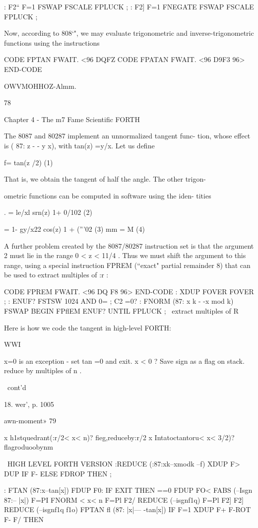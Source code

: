 {{: F2“ F=1 FSWAP FSCALE FPLUCK ;
: F2] F=1 FNEGATE FSWAP FSCALE FPLUCK ;

Now, according to 808‘", we may evaluate trigonometric and
inverse-trigonometric functions using the instructions

CODE FPTAN FWAIT. <96 DQFZ %
CODE FPATAN FWAIT. <96 D9F3 96> END-CODE

OWVMOHHOZ-Almm.

78

Chapter 4 - The m7 Fame Scientific FORTH

The 8087 and 80287 implement an unnormalized tangent func-
tion, whose effect is ( 87: z - - y x), with tan(z) =y/x. Let us define

f= tan(z /2) (1)

That is, we obtain the tangent of half the angle. The other trigon-

ometric functions can be computed in software using the iden-
tities

. = le/xl
srn(z) 1+ 0/102 (2)

= 1- gy/x22
cos(z) 1 + (”’02 (3)
mm = M (4)

A further problem created by the 8087/80287 instruction set is
that the argument 2 must lie in the range 0 < z < 11/4 . Thus we
must shift the argument to this range, using a special instruction
FPREM (“exact" partial remainder 8) that can be used to extract
multiples of :r :

CODE FPREM FWAIT. <96 DQ F8 96> END-CODE
: XDUP FOVER FOVER ;
: ENUF? FSTSW 1024 AND 0= ; \bit C2 =0?
: FNORM (87: x k - -x mod k) FSWAP
BEGIN FPflEM ENUF? UNTIL FPLUCK ;
\ extract multiples of R

Here is how we code the tangent in high-level FORTH:

WWI

x=0 is an exception - set tan =0 and exit.
x < 0 ? Save sign as a flag on stack.
reduce by multiples of n .

\ cont'd

 

18. wer', p. 1005

awn-moment» 79

x h1stquedrant(:r/2< x< n)? fieg,reduceby:r/2
x Intatoctantoru< x< 3/2)? flagroduoobynm

\ HIGH LEVEL FORTH VERSION
:REDUCE (:87:xk--xmodk --f)
XDUP F> DUP IF F- ELSE FDROP THEN ;

: FTAN (87:x--tan[x]) FDUP F0:
IF EXIT THEN \tan==0
FDUP FO< FABS (--Isgn 87:-- |x|)
F=PI FNORM \0< x< n
F=Pl F2/ REDUCE (--isgnf1q)
F=Pl F2] F2] REDUCE (--isgnf1q f1o)
FPTAN fl (87: |x|— -tan[x])
IF F=1 XDUP F+ F-ROT F- F/ THEN

}}
